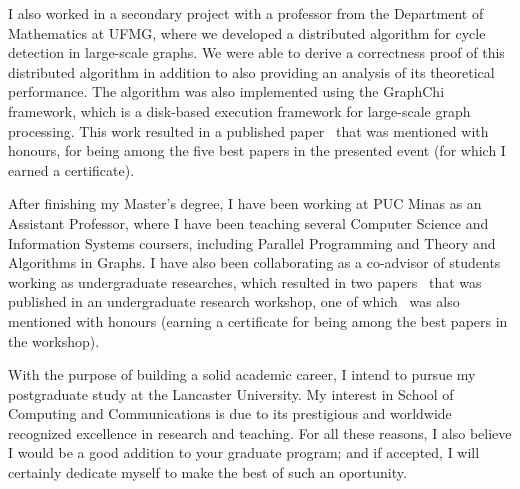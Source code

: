 \documentclass{article}
\begin{document}
I also worked in a secondary project with a professor from the Department of
Mathematics at UFMG, where we developed a distributed algorithm for cycle
detection in large-scale graphs. We were able to derive a correctness proof of
this distributed algorithm in addition to also providing an analysis of its
theoretical performance.  The algorithm was also implemented using the GraphChi
framework, which is a disk-based execution framework for large-scale graph
processing. This work resulted in a published paper~\cite{rocha2015cycles} that
was mentioned with honours, for being among the five best papers in the
presented event (for which I earned a certificate).

After finishing my Master's degree, I have been working at PUC Minas as an
Assistant Professor, where I have been teaching several Computer Science and
Information Systems coursers, including Parallel Programming and Theory and
Algorithms in Graphs.  I have also been collaborating as a co-advisor of
students working as undergraduate researches, which resulted in two
papers~\cite{saffran2015apriori,pereira2015stencilbench} that was published in
an undergraduate research workshop, one of which~\cite{pereira2015stencilbench}
was also mentioned with honours (earning a certificate for being among the best
papers in the workshop).


With the purpose of building a solid academic career, I intend to pursue my
postgraduate study at the Lancaster University.  My interest in School of
Computing and Communications is due to its prestigious and worldwide recognized
excellence in research and teaching. For all these reasons, I also believe I
would be a good addition to your graduate program; and if accepted, I will
certainly dedicate myself to make the best of such an oportunity.

\nocite{*}


\end{document}
